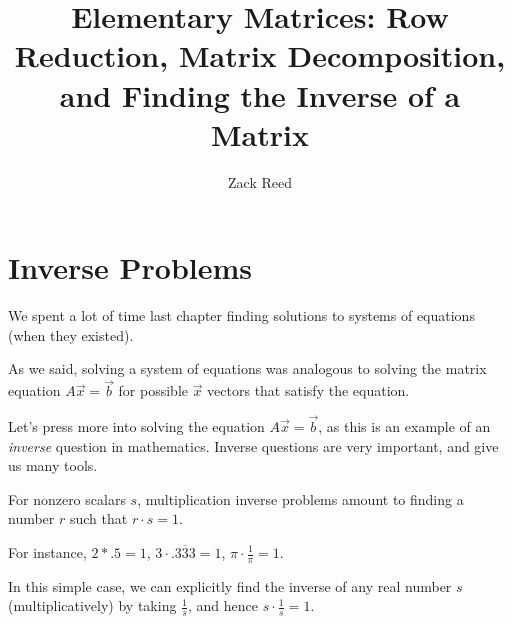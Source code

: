\documentclass{ximera}
\author{Zack Reed}
\title{Elementary Matrices: Row Reduction, Matrix Decomposition, and Finding the Inverse of a Matrix}
\begin{document}
\begin{abstract}



\end{abstract}
\maketitle


\section*{Inverse Problems}

We spent a lot of time last chapter finding solutions to systems of equations (when they existed).

As we said, solving a system of equations was analogous to solving the matrix equation $A\vec{x}=\vec{b}$ for possible $\vec{x}$ vectors that satisfy the equation. 

Let's press more into solving the equation $A\vec{x}=\vec{b}$, as this is an example of an \emph{inverse} question in mathematics. Inverse questions are very important, and give us many tools.

\begin{example}

  For nonzero scalars $s$, multiplication inverse problems amount to finding a number $r$ such that $r\cdot s=1$.

  For instance, $2*.5=1$, $3\cdot .\overline{333}=1$, $\pi\cdot \frac{1}{\pi}=1$. 

  In this simple case, we can explicitly find the inverse of any real number $s$ (multiplicatively) by taking $\frac{1}{s}$, and hence $s\cdot\frac{1}{s}=1$.

\end{example}
\end{document}
